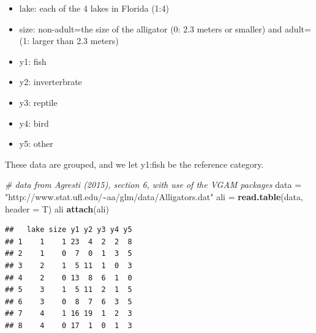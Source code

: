 \documentclass[
  ignorenonframetext,
]{beamer}
\newenvironment{Shaded}{\begin{snugshade}}{\end{snugshade}}
\newcommand{\AttributeTok}[1]{\textcolor[rgb]{0.13,0.29,0.53}{#1}}
\newcommand{\CommentTok}[1]{\textcolor[rgb]{0.56,0.35,0.01}{\textit{#1}}}
\newcommand{\FunctionTok}[1]{\textcolor[rgb]{0.13,0.29,0.53}{\textbf{#1}}}
\newcommand{\NormalTok}[1]{#1}
\newcommand{\OtherTok}[1]{\textcolor[rgb]{0.56,0.35,0.01}{#1}}
\newcommand{\StringTok}[1]{\textcolor[rgb]{0.31,0.60,0.02}{#1}}
\providecommand{\tightlist}{%
  \setlength{\itemsep}{0pt}\setlength{\parskip}{0pt}}
\begin{document}
\begin{frame}
\begin{itemize}
\tightlist
\item
  lake: each of the 4 lakes in Florida (1:4)
\item
  size: non-adult=the size of the alligator (0: 2.3 meters or smaller)
  and adult=(1: larger than 2.3 meters)
\item
  y1: fish
\item
  y2: inverterbrate
\item
  y3: reptile
\item
  y4: bird
\item
  y5: other
\end{itemize}

These data are grouped, and we let y1:fish be the reference category.
\end{frame}

\begin{frame}[fragile]
\small

\begin{Shaded}
\begin{Highlighting}[]
\CommentTok{\# data from Agresti (2015), section 6, with use of the VGAM packages}
\NormalTok{data }\OtherTok{=} \StringTok{"http://www.stat.ufl.edu/\textasciitilde{}aa/glm/data/Alligators.dat"}
\NormalTok{ali }\OtherTok{=} \FunctionTok{read.table}\NormalTok{(data, }\AttributeTok{header =}\NormalTok{ T)}
\NormalTok{ali}
\FunctionTok{attach}\NormalTok{(ali)}
\end{Highlighting}
\end{Shaded}

\begin{verbatim}
##   lake size y1 y2 y3 y4 y5
## 1    1    1 23  4  2  2  8
## 2    1    0  7  0  1  3  5
## 3    2    1  5 11  1  0  3
## 4    2    0 13  8  6  1  0
## 5    3    1  5 11  2  1  5
## 6    3    0  8  7  6  3  5
## 7    4    1 16 19  1  2  3
## 8    4    0 17  1  0  1  3
\end{verbatim}
\end{frame}
\end{document}
